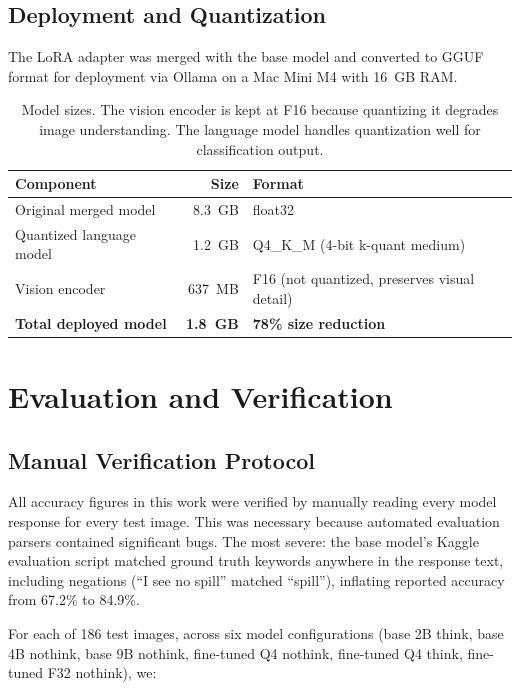 \documentclass[12pt, a4paper]{article}
\begin{document}
\subsection{Deployment and Quantization}

The LoRA adapter was merged with the base model and converted to GGUF format for deployment via Ollama on a Mac Mini M4 with 16~GB RAM.

\begin{table}[H]
\centering
\begin{tabular}{lrl}
\toprule
\textbf{Component} & \textbf{Size} & \textbf{Format} \\
\midrule
Original merged model & 8.3~GB & float32 \\
Quantized language model & 1.2~GB & Q4\_K\_M (4-bit k-quant medium) \\
Vision encoder & 637~MB & F16 (not quantized, preserves visual detail) \\
\midrule
\textbf{Total deployed model} & \textbf{1.8~GB} & \textbf{78\% size reduction} \\
\bottomrule
\end{tabular}
\caption{Model sizes. The vision encoder is kept at F16 because quantizing it degrades image understanding. The language model handles quantization well for classification output.}
\end{table}

\section{Evaluation and Verification}
\label{sec:verification}

\subsection{Manual Verification Protocol}

All accuracy figures in this work were verified by manually reading every model response for every test image. This was necessary because automated evaluation parsers contained significant bugs. The most severe: the base model's Kaggle evaluation script matched ground truth keywords anywhere in the response text, including negations (``I see no spill'' matched ``spill''), inflating reported accuracy from 67.2\% to 84.9\%.

For each of 186 test images, across six model configurations (base 2B think, base 4B nothink, base 9B nothink, fine-tuned Q4 nothink, fine-tuned Q4 think, fine-tuned F32 nothink), we:
\end{document}

